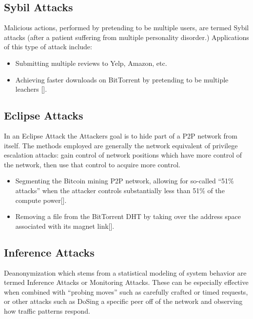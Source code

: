 \documentclass{article}
\begin{document}
\subsection{Sybil Attacks}

Malicious actions, performed by pretending to be multiple users, are termed Sybil attacks (after a patient suffering from multiple personality disorder.) Applications of this type of attack include:

\begin{itemize}
    \item Submitting multiple reviews to Yelp, Amazon, etc.
    \item Achieving faster downloads on BitTorrent by pretending to be multiple leachers [\cite{freeridingBittorrent}].
\end{itemize}

\subsection{Eclipse Attacks}

In an Eclipse Attack the Attackers goal is to hide part of a P2P network from itself. The methods employed are generally the network equivalent of privilege escalation attacks: gain control of network positions which have more control of the network, then use that control to acquire more control.

\begin{itemize}
    \item Segmenting the Bitcoin mining P2P network, allowing for so-called “51\% attacks” when the attacker controls substantially less than 51\% of the compute power[\cite{bitcoinEclipse}].
    \item Removing a file from the BitTorrent DHT by taking over the address space associated with its magnet link[\cite{bittorrentSybilAttacks}].
\end{itemize}

\subsection{Inference Attacks}
\label{inference-attacks}

Deanonymization which stems from a statistical modeling of system behavior are termed Inference Attacks or Monitoring Attacks. These can be especially effective when combined with “probing moves” such as carefully crafted or timed requests, or other attacks such as DoSing a specific peer off of the network and observing how traffic patterns respond.
\end{document}
